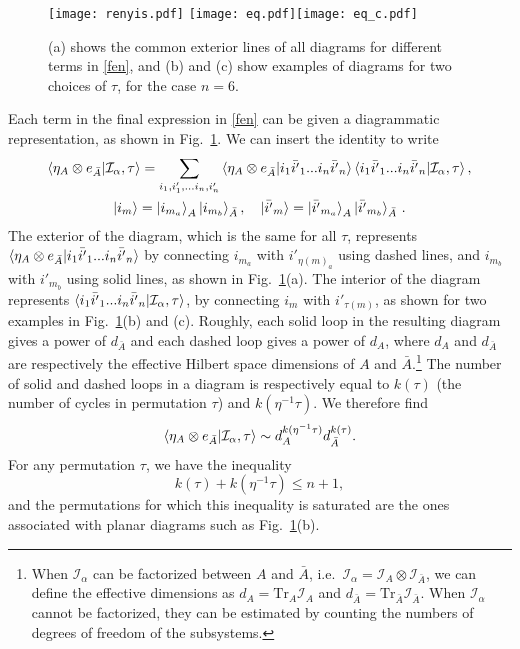 \documentclass[a4paper,11pt]{article}
\newcommand\vev[1]{{\ensuremath{\left\langle{#1}\right\rangle}}}
\newcommand{\be}{\begin{equation}}
\newcommand{\ee}{\end{equation}}
\newcommand\al{{\alpha}}
\newcommand\sig{\sigma}
\newcommand\ov{\over}
\newcommand\sI{{\ensuremath{{\mathcal I}}}}
\newcommand\sS{{\mathcal S}}
\newcommand\sZ{{\mathcal Z}}
\newcommand{\Tr}{\text{Tr}}
\begin{document}
\iffalse
We inserting the identity twice in the last expression of~\eqref{rnyi} and neglect the term involving $Q$ to obtain 
\be \label{fen}
\sZ_{n, A} \approx {1 \ov Z_2^n} \sum_{\sig, \tau} g^{\tau\sig} \vev{\eta_A \otimes e_{\bar A} | \sI_\al , \tau} \vev{\sI_\al, \sig|\rho_0,e} \approx {1 \ov Z_1^n} \sum_{\tau \in \sS_n} \vev{\eta_A \otimes e_{\bar A} | \sI_\al , \tau} ,
\ee
where we have used that $Z_1 \gg 1$ and that $\rho_0$ is a pure state.
\fi

\begin{figure}[]
 \centering
 \texttt{[image: renyis.pdf]} \texttt{[image: eq.pdf]}\texttt{[image: eq\_c.pdf]}
 \caption{(a) shows the common exterior lines of all diagrams for different terms in \eqref{fen}, and (b) and (c) show examples of diagrams for two choices of $\tau$, for the case $n=6$.}
 \label{fig:Renyi_diagrams}
\end{figure}


Each term in the final expression in \eqref{fen} can be given a diagrammatic representation, as shown in Fig.~\ref{fig:Renyi_diagrams}. We can insert the identity to write 
\be 
\begin{gathered} 
\vev{\eta_A \otimes e_{\bar A} | \sI_\al , \tau} = \sum_{i_1, i'_1, ... i_n, i'_n} \braket{\eta_A \otimes e_{\bar{A}}|i_1 \bar{i'}_1 ... i_n \bar{i'}_n} \braket{i_1 \bar{i'}_1 ... i_n \bar{i'}_n| \sI_{\al}, \tau}, \\
\ket{i_m} = \ket{i_{m_a}}_{A} \ket{i_{m_b}}_{\bar{A}}, \quad \ket{\bar{i'}_m} = \ket{\bar{i'}_{m_a}}_{A} \ket{\bar{i'}_{m_b}}_{\bar{A}} \,.
\end{gathered} 
\ee
The exterior of the diagram, which is the same for all $\tau$, represents $\braket{\eta_A \otimes e_{\bar{A}}|i_1 \bar{i'}_1 ... i_n \bar{i'}_n}$ by connecting $i_{m_a}$ with $i'_{\eta(m)_a}$ using dashed lines, and $i_{m_b}$ with $i'_{m_b}$ using solid lines, as shown in Fig.~\ref{fig:Renyi_diagrams}(a). The interior of the diagram represents 
$\braket{i_1 \bar{i'}_1 ... i_n \bar{i'}_n| \sI_{\al}, \tau}$, by connecting $i_m$ with $i'_{\tau(m)}$, as shown for two examples in Fig.~\ref{fig:Renyi_diagrams}(b) and (c). Roughly, each solid loop in the resulting diagram gives a power of $d_{\bar{A}}$ and each dashed loop gives a power of $d_{A}$, where $d_A$ and $d_{\bar{A}}$ are respectively the effective Hilbert space dimensions of $A$ and $\bar{A}$.\footnote{When $\sI_\al$ can be factorized between $A$ and $\bar A$, i.e.~$\sI_\al = \sI_A \otimes \sI_{\bar A}$, we can define the effective dimensions as $d_A = \Tr_A \sI_A$ and $d_{\bar A} = \Tr_{\bar A} \sI_{\bar A}$. When $\sI_\al$ cannot be factorized, they can be estimated by counting the numbers of degrees of freedom of the subsystems.} The number of solid and dashed loops in a diagram is respectively equal to $k(\tau)$ (the number of cycles in permutation $\tau$) and $k(\eta^{-1}\tau)$. We therefore find 
\be 
\label{sat}
\braket{\eta_A \otimes e_{\bar{A}}| \sI_{\al}, \tau}\sim d_A^{k(\eta^{-1}\tau)} d_{\bar{A}}^{k(\tau)}.
\ee
For any permutation $\tau$, we have the inequality 
\be 
k(\tau)+ k(\eta^{-1}\tau) \leq n+1,
\ee
and the permutations for which this inequality is saturated are the ones associated with planar diagrams such as Fig.~\ref{fig:Renyi_diagrams}(b). 
\end{document}
